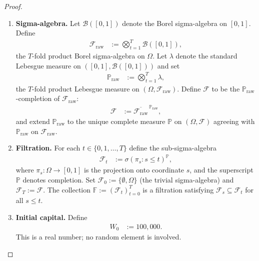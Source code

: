 \documentclass[12pt,openany]{book}
\newcommand{\calF}{\mathcal{F}}
\newcommand{\Prob}{\mathbb{P}}
\numberwithin{equation}{chapter}
\theoremstyle{plain}
\theoremstyle{definition}
\theoremstyle{remark}
\numberwithin{equation}{chapter}
\theoremstyle{plain}
\begin{document}
\begin{proof}
\begin{enumerate}[label=\textbf{Phase~\Roman*.}]
\begin{enumerate}[label=\textbf{Step~1.\arabic*.}]
  \item \textbf{Sigma-algebra.}
        Let $\mathcal{B}([0,1])$ denote the Borel sigma-algebra on
        $[0,1]$.  Define
        \begin{align}
          \calF_{\mathrm{raw}}
            &:= \bigotimes_{t=1}^{T} \mathcal{B}([0,1]),
          \label{eq:cons-fraw}
        \end{align}
        the $T$-fold product Borel sigma-algebra on $\Omega$.
        Let $\lambda$ denote the standard Lebesgue measure on
        $([0,1], \mathcal{B}([0,1]))$ and set
        \begin{align}
          \Prob_{\mathrm{raw}}
            &:= \bigotimes_{t=1}^{T} \lambda,
          \label{eq:cons-probraw}
        \end{align}
        the $T$-fold product Lebesgue measure on
        $(\Omega, \calF_{\mathrm{raw}})$.
        Define $\calF$ to be the $\Prob_{\mathrm{raw}}$-completion
        of $\calF_{\mathrm{raw}}$:
        \begin{align}
          \calF
            &:= \overline{\calF_{\mathrm{raw}}}^{\,\Prob_{\mathrm{raw}}},
          \label{eq:cons-f}
        \end{align}
        and extend $\Prob_{\mathrm{raw}}$ to the unique complete
        measure $\Prob$ on $(\Omega, \calF)$ agreeing with
        $\Prob_{\mathrm{raw}}$ on $\calF_{\mathrm{raw}}$.

  \item \textbf{Filtration.}
        For each $t \in \{0, 1, \ldots, T\}$ define the
        sub-sigma-algebra
        \begin{align}
          \calF_t
            &:= \sigma\!\left(
                  \pi_s : s \leq t
                \right)^{\Prob},
          \label{eq:cons-filtration}
        \end{align}
        where $\pi_s : \Omega \to [0,1]$ is the projection onto
        coordinate $s$, and the superscript $\Prob$ denotes
        completion.  Set $\calF_0 := \{\emptyset, \Omega\}$ (the
        trivial sigma-algebra) and $\calF_T := \calF$.  The
        collection $\mathbb{F} := (\calF_t)_{t=0}^{T}$ is a
        filtration satisfying $\calF_s \subseteq \calF_t$ for all
        $s \leq t$.

  \item \textbf{Initial capital.}
        Define
        \begin{align}
          W_0 &:= 100{,}000.
          \label{eq:cons-w0}
        \end{align}
        This is a real number; no random element is involved.


\end{enumerate}
\end{enumerate}
\end{proof}
\end{document}
